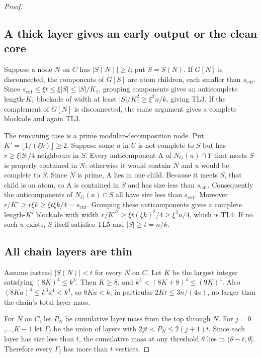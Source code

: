 \documentclass[11pt,a4paper]{article}
\theoremstyle{definition}
\theoremstyle{remark}
\numberwithin{equation}{section}
\begin{document}
\begin{proof}
\subsection{A thick layer gives an early output or the clean core}
Suppose a node \(N\) on \(C\) has \(|S(N)|\ge\allowbreak t\); put \(S=S(N)\). If \(G[N]\) is disconnected, the components of \(G[S]\) are atom children, each smaller than \(s_{\mathrm{cut}}\). Since \(s_{\mathrm{cut}}\le\allowbreak \xi t\le\allowbreak \xi|S|\le\allowbreak |S|/K_{1}\), grouping components gives an anticomplete length-\(K_{1}\) blockade of width at least \(|S|/K_{1}^{2}\ge\allowbreak \xi^{2} n/k\), giving TL3. If the complement of \(G[N]\) is disconnected, the same argument gives a complete blockade and again TL3.

The remaining case is a prime modular-decomposition node. Put \(K'=\lfloor 1/(\xi k)\rfloor\ge\allowbreak 2\). Suppose some \(u\) in \(U\) is not complete to \(S\) but has \(r\ge\allowbreak \xi|S|/4\) neighbours in \(S\). Every anticomponent A of \(N_{G}(u) \cap  Y\) that meets \(S\) is properly contained in \(N\): otherwise it would contain \(N\) and \(u\) would be complete to \(S\). Since \(N\) is prime, A lies in one child. Because it meets \(S\), that child is an atom, so A is contained in \(S\) and has size less than \(s_{\mathrm{cut}}\). Consequently the anticomponents of \(N_{G}(u) \cap  S\) all have size less than \(s_{\mathrm{cut}}\). Moreover \(r/K'\ge\allowbreak r \xi k\ge\allowbreak \xi t \xi k/4=s_{\mathrm{cut}}\). Grouping these anticomponents gives a complete length-\(K'\) blockade with width \(r/K'^{2}\ge\allowbreak \xi t(\xi k)^{2}/4\ge\allowbreak \xi^{3} n/4\), which is TL4. If no such \(u\) exists, \(S\) itself satisfies TL5 and \(|S|\ge\allowbreak t=n/k\).
\subsection{All chain layers are thin}
Assume instead \(|S(N)|<t\) for every \(N\) on \(C\). Let \(K\) be the largest integer satisfying \((8K)^{4}\le\allowbreak k^{3}\). Then \(K\ge\allowbreak 8\), and \(k^{3}<(8K+8)^{4}\le\allowbreak (9K)^{4}\). Also \((8Ka)^{4}\le\allowbreak k^{3}a^{4}<k^{4}\), so \(8Ka<k\); in particular \(2Kt\le 3n/(4a)\), no larger than the chain's total layer mass.

For \(N\) on \(C\), let \(P_{N}\) be cumulative layer mass from the top through \(N\). For \(j=0\),...,\(K-1\) let \(\Gamma_{j}\) be the union of layers with \(2jt<P_{N}\le 2(j+1)t\). Since each layer has size less than \(t\), the cumulative mass at any threshold \(\theta\) lies in (\(\theta-t,\allowbreak \theta\)]. Therefore every \(\Gamma_{j}\) has more than \(t\) vertices.


\end{proof}
\end{document}

